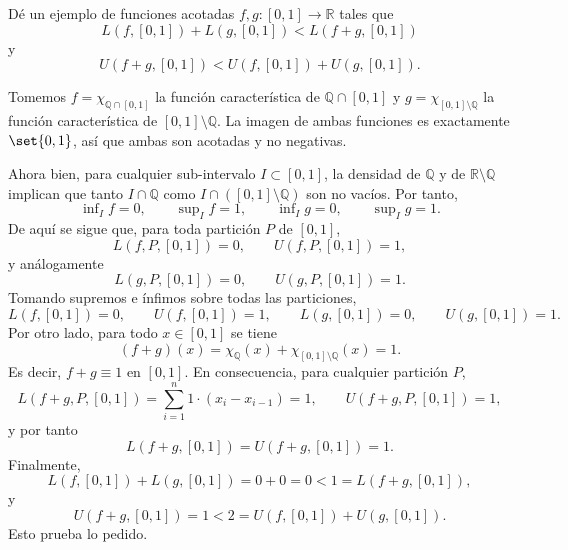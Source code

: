 \setcounter{eje}{3}
\begin{ejer}
Dé un ejemplo de funciones acotadas $f, g\colon [0,1] \to \mathbb{R}$ tales que
$$
L(f, [0,1]) + L(g, [0,1]) < L(f + g, [0,1])
$$
y
$$
U(f + g, [0,1]) < U(f, [0,1]) + U(g, [0,1]).
$$
\end{ejer}
\begin{sol}
Tomemos $f = \chi_{\mathbb{Q} \cap[0,1]}$ la función característica de $\mathbb{Q} \cap[0,1]$ y $g = \chi_{[0,1]\setminus\mathbb{Q}}$ la función característica de $[0,1]\setminus\mathbb{Q}$. La imagen de ambas funciones es exactamente $\set{0,1}$, así que ambas son acotadas y no negativas.\par
Ahora bien, para cualquier sub-intervalo $I\subset [0,1]$, la densidad de $\mathbb{Q}$ y de $\mathbb{R\setminus\mathbb{Q}}$ implican que tanto $I\cap\mathbb{Q}$ como 
$I\cap([0,1]\setminus\mathbb{Q})$ son no vacíos. Por tanto,
\[
\inf\nolimits_I f=0,\qquad \sup\nolimits_I f=1,\qquad 
\inf\nolimits_I g=0,\qquad \sup\nolimits_I g=1.
\]
De aquí se sigue que, para toda partición $P$ de $[0,1]$,
\[
L(f,P,[0,1])=0,\qquad U(f,P,[0,1])=1,
\]
y análogamente
\[
L(g,P,[0,1])=0,\qquad U(g,P,[0,1])=1.
\]
Tomando supremos e ínfimos sobre todas las particiones,
\[
L(f,[0,1])=0,\qquad U(f,[0,1])=1,
\qquad
L(g,[0,1])=0,\qquad U(g,[0,1])=1.
\]
Por otro lado, para todo $x\in[0,1]$ se tiene
\[
(f+g)(x)=\chi_{\mathbb{Q}}(x)+\chi_{[0,1]\setminus\mathbb{Q}}(x)=1.
\]
Es decir, $f+g\equiv 1$ en $[0,1]$. En consecuencia, para cualquier partición $P$,
\[
L(f+g,P,[0,1])=\sum_{i=1}^n 1\cdot (x_i-x_{i-1})=1,
\qquad
U(f+g,P,[0,1])=1,
\]
y por tanto
\[
L(f+g,[0,1])=U(f+g,[0,1])=1.
\]
Finalmente,
\[
L(f,[0,1])+L(g,[0,1])=0+0=0<1=L(f+g,[0,1]),
\]
y
\[
U(f+g,[0,1])=1<2=U(f,[0,1])+U(g,[0,1]).
\]
Esto prueba lo pedido.
\end{sol}